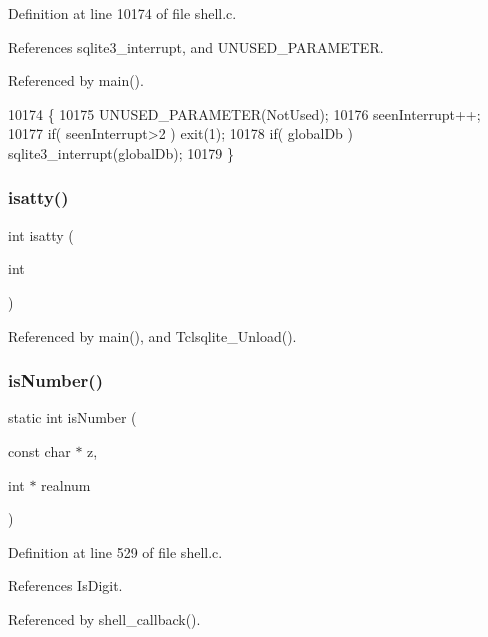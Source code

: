 Definition at line 10174 of file shell.\+c.



References sqlite3\+\_\+interrupt, and U\+N\+U\+S\+E\+D\+\_\+\+P\+A\+R\+A\+M\+E\+T\+ER.



Referenced by main().


\begin{DoxyCode}
10174                                           \{
10175   UNUSED_PARAMETER(NotUsed);
10176   seenInterrupt++;
10177   \textcolor{keywordflow}{if}( seenInterrupt>2 ) exit(1);
10178   \textcolor{keywordflow}{if}( globalDb ) sqlite3_interrupt(globalDb);
10179 \}
\end{DoxyCode}
\mbox{\label{shell_8c_ab4155ffea05dab2dafae68fd88a0517f}} 
\subsubsection{isatty()}
{\footnotesize\ttfamily int isatty (\begin{DoxyParamCaption}\item[{int}]{ }\end{DoxyParamCaption})}



Referenced by main(), and Tclsqlite\+\_\+\+Unload().

\mbox{\label{shell_8c_ad23756db4382a48e46291ecf890fd04d}} 
\subsubsection{is\+Number()}
{\footnotesize\ttfamily static int is\+Number (\begin{DoxyParamCaption}\item[{const char $\ast$}]{z,  }\item[{int $\ast$}]{realnum }\end{DoxyParamCaption})\hspace{0.3cm}{\ttfamily [static]}}



Definition at line 529 of file shell.\+c.



References Is\+Digit.



Referenced by shell\+\_\+callback().


